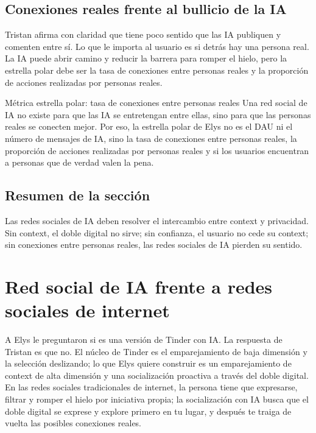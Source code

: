 \documentclass[a4paper]{article}
\begin{document}
\subsection{Conexiones reales frente al bullicio de la IA}

Tristan afirma con claridad que tiene poco sentido que las IA publiquen y comenten entre sí. Lo que le importa al usuario es si detrás hay una persona real. La IA puede abrir camino y reducir la barrera para romper el hielo, pero la estrella polar debe ser la tasa de conexiones entre personas reales y la proporción de acciones realizadas por personas reales.

\begin{importantbox}{Métrica estrella polar: tasa de conexiones entre personas reales}
Una red social de IA no existe para que las IA se entretengan entre ellas, sino para que las personas reales se conecten mejor. Por eso, la estrella polar de Elys no es el DAU ni el número de mensajes de IA, sino la tasa de conexiones entre personas reales, la proporción de acciones realizadas por personas reales y si los usuarios encuentran a personas que de verdad valen la pena.
\end{importantbox}

\subsection{Resumen de la sección}

Las redes sociales de IA deben resolver el intercambio entre context y privacidad. Sin context, el doble digital no sirve; sin confianza, el usuario no cede su context; sin conexiones entre personas reales, las redes sociales de IA pierden su sentido.
\section{Red social de IA frente a redes sociales de internet}

A Elys le preguntaron si es una versión de Tinder con IA. La respuesta de Tristan es que no. El núcleo de Tinder es el emparejamiento de baja dimensión y la selección deslizando; lo que Elys quiere construir es un emparejamiento de context de alta dimensión y una socialización proactiva a través del doble digital. En las redes sociales tradicionales de internet, la persona tiene que expresarse, filtrar y romper el hielo por iniciativa propia; la socialización con IA busca que el doble digital se exprese y explore primero en tu lugar, y después te traiga de vuelta las posibles conexiones reales.
\end{document}
